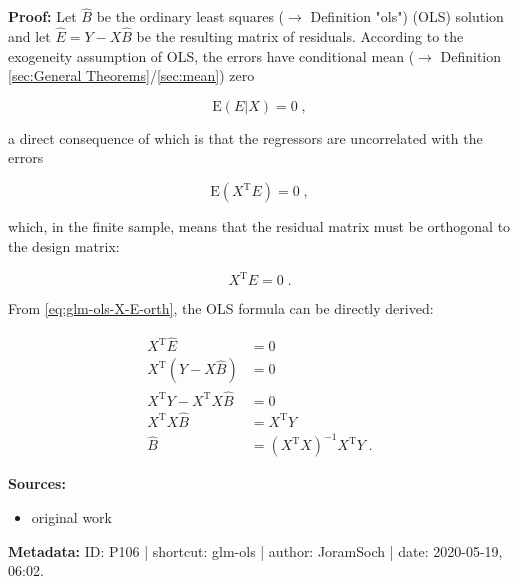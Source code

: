 \documentclass[a4paper,12pt,twoside]{book}
\begin{document}
\vspace{1em}
\textbf{Proof:} Let $\hat{B}$ be the ordinary least squares ($\rightarrow$ Definition "ols") (OLS) solution and let $\hat{E} = Y - X\hat{B}$ be the resulting matrix of residuals. According to the exogeneity assumption of OLS, the errors have conditional mean ($\rightarrow$ Definition \ref{sec:General Theorems}/\ref{sec:mean}) zero

\begin{equation} \label{eq:glm-ols-OLS-exo}
\mathrm{E}(E|X) = 0 \; ,
\end{equation}

a direct consequence of which is that the regressors are uncorrelated with the errors

\begin{equation} \label{eq:glm-ols-OLS-uncorr}
\mathrm{E}(X^\mathrm{T} E) = 0 \; ,
\end{equation}

which, in the finite sample, means that the residual matrix must be orthogonal to the design matrix:

\begin{equation} \label{eq:glm-ols-X-E-orth}
X^\mathrm{T} \hat{E} = 0 \; .
\end{equation}

From \eqref{eq:glm-ols-X-E-orth}, the OLS formula can be directly derived:

\begin{equation} \label{eq:glm-ols-OLS-qed}
\begin{split}
X^\mathrm{T} \hat{E} &= 0 \\
X^\mathrm{T} \left( Y - X\hat{B} \right) &= 0 \\
X^\mathrm{T} Y - X^\mathrm{T} X\hat{B} &= 0 \\
X^\mathrm{T} X\hat{B} &= X^\mathrm{T} Y \\
\hat{B} &= (X^\mathrm{T} X)^{-1} X^\mathrm{T} Y \; .
\end{split}
\end{equation}


\vspace{1em}
\textbf{Sources:}
\begin{itemize}
\item original work\end{itemize}


\vspace{1em}
\textbf{Metadata:} ID: P106 | shortcut: glm-ols | author: JoramSoch | date: 2020-05-19, 06:02.
\vspace{1em}
\end{document}
